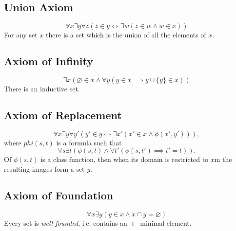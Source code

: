 \documentclass[../../main.tex]{subfiles}
\begin{document}
\subsection{Union Axiom}
$$\forall x \exists y \forall z \left(z \in y \iff \exists w \left(z \in w \wedge w \in x\right)\right)$$
For any set $x$ there is a set which is the union of all the elements of $x$.

\subsection{Axiom of Infinity}
$$\exists x \left(\varnothing \in x \wedge \forall y \left(y \in x \implies y \cup \{y\} \in x \right)\right)$$
There is an inductive set.

\subsection{Axiom of Replacement}
$$\forall x \exists y \forall y' \left(y' \in y \iff \exists x' \left(x' \in x \wedge \phi(x', y')\right)\right),$$
where $phi(s, t)$ is a formula such that 
$$\forall s \exists t \left(\phi(s, t) \wedge \forall t' \left(\phi(s, t') \implies t' = t\right)\right).$$
Of $\phi(s, t)$ is a class function, then when its domain is restricted to $x$m the resulting images form a set $y$.

\subsection{Axiom of Foundation}
$$\forall x \exists y \left(y \in x \wedge x \cap y = \varnothing \right)$$
Every set is \textit{well-founded}, i.e. contains an $\in$-minimal element.
\end{document}
